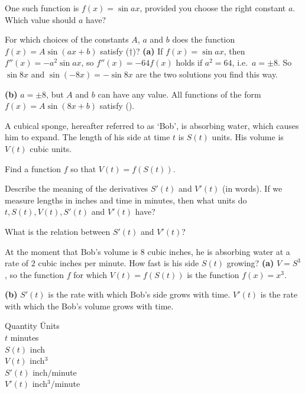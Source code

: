 \begin{multicols}{2}
\subprob  One such function is $f(x) = \sin ax$, provided you choose the
right constant $a$. Which value should $a$ have?




\subprob  For which choices of the constants $A$, $a$ and $b$ does the
function $f(x) = A\sin (ax+b)$ satisfy ($\dag$)?
\answer 
\textbf{(a)} If $f(x) = \sin ax$, then $f''(x) = -a^2 \sin ax$, so
$f''(x) = -64f(x)$ holds if $a^2 = 64$, i.e.~$a=\pm 8$.  So $\sin 8x
$ and $\sin(-8x) = -\sin 8x$ are the two solutions you find this
way.  




\textbf{(b)} $a=\pm8$, but $A$ and $b$ can have any value.  All
functions of the form $f(x) =  A \sin(8x+b)$ satisfy (\dag).
\endanswer








\problem \groupproblem A cubical sponge, hereafter referred to as `Bob', is 
absorbing water, which causes him to expand.  The length of his side at
time $t$ is $S(t)$ units.  His volume is $V(t)$ cubic units.

\subprob  Find a function $f$ so that $V(t) = f(S(t))$.

\subprob  Describe the meaning of the derivatives $S'(t)$ and $V'(t)$ (in
words).  If we measure lengths in inches and time in minutes, then what units do
$t, S(t), V(t), S'(t)$ and $V'(t)$ have?




\subprob  What is the relation between $S'(t)$ and $V'(t)$?  




\subprob  At the moment that Bob's volume is 8 cubic inches, he is
absorbing water at a rate of $2$ cubic inches per minute.  How fast is his
side $ S(t) $ growing?
\answer 
\textbf{(a)} $V=S^3$, so the function $f$ for which $V(t)=f(S(t))$
is the function $f(x) = x^3$.




\textbf{(b)} $S'(t)$ is the rate with which Bob's side grows with
time.  $V'(t)$ is the rate with which the Bob's volume grows with
time.
\begin{tabbing}
  Quantity \hspace{2ex}\= Units \\
  $t$ \> minutes\\
  $S(t)$ \> inch \\
  $V(t)$ \> inch$^3$ \\
  $S'(t)$ \> inch$/$minute \\
  $V'(t)$ \> inch$^3/$minute
\end{tabbing}





\end{multicols}
